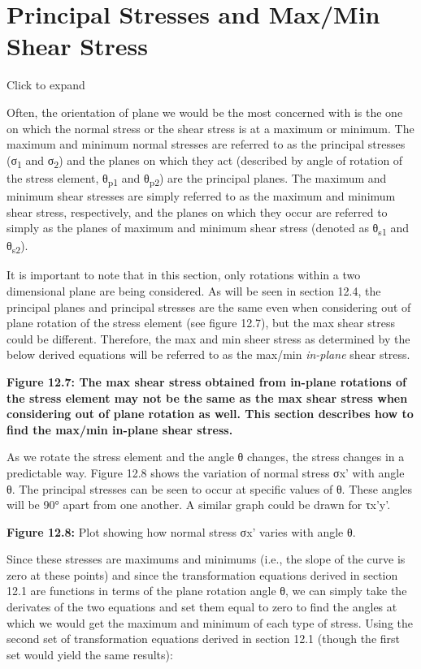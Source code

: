 \documentclass[
  letterpaper,
  DIV=11,
  numbers=noendperiod]{scrreprt}
\begin{document}
\section{Principal Stresses and Max/Min Shear
Stress}\label{principal-stresses-and-maxmin-shear-stress}

Click to expand

Often, the orientation of plane we would be the most concerned with is
the one on which the normal stress or the shear stress is at a maximum
or minimum. The maximum and minimum normal stresses are referred to as
the principal stresses (σ\textsubscript{1} and σ\textsubscript{2}) and
the planes on which they act (described by angle of rotation of the
stress element, θ\textsubscript{p1} and θ\textsubscript{p2}) are the
principal planes. The maximum and minimum shear stresses are simply
referred to as the maximum and minimum shear stress, respectively, and
the planes on which they occur are referred to simply as the planes of
maximum and minimum shear stress (denoted as θ\textsubscript{s1} and
θ\textsubscript{s2}).

It is important to note that in this section, only rotations within a
two dimensional plane are being considered. As will be seen in section
12.4, the principal planes and principal stresses are the same even when
considering out of plane rotation of the stress element (see figure
12.7), but the max shear stress could be different. Therefore, the max
and min sheer stress as determined by the below derived equations will
be referred to as the max/min \emph{in-plane} shear stress.

\textbf{Figure 12.7: The max shear stress obtained from in-plane
rotations of the stress element may not be the same as the max shear
stress when considering out of plane rotation as well. This section
describes how to find the max/min in-plane shear stress.}

As we rotate the stress element and the angle θ changes, the stress
changes in a predictable way. Figure 12.8 shows the variation of normal
stress σx' with angle θ. The principal stresses can be seen to occur at
specific values of θ. These angles will be 90° apart from one another. A
similar graph could be drawn for τx'y'.

\textbf{Figure 12.8:} Plot showing how normal stress σx' varies with
angle θ.

Since these stresses are maximums and minimums (i.e., the slope of the
curve is zero at these points) and since the transformation equations
derived in section 12.1 are functions in terms of the plane rotation
angle θ, we can simply take the derivates of the two equations and set
them equal to zero to find the angles at which we would get the maximum
and minimum of each type of stress. Using the second set of
transformation equations derived in section 12.1 (though the first set
would yield the same results):
\end{document}
